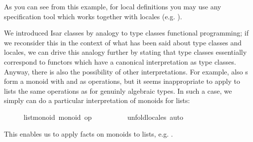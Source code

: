 \begin{isabellebody}
\begin{isamarkuptext}
  \noindent As you can see from this example, for local
  definitions you may use any specification tool
  which works together with locales (e.g. \cite{krauss2006}).%
\end{isamarkuptext}%
\isamarkuptrue%
%
\isamarkuptrue%
%
\begin{isamarkuptext}%
We introduced Isar classes by analogy to type classes
  functional programming;  if we reconsider this in the
  context of what has been said about type classes and locales,
  we can drive this analogy further by stating that type
  classes essentially correspond to functors which have
  a canonical interpretation as type classes.
  Anyway, there is also the possibility of other interpretations.
  For example, also s form a monoid with
   and \isa{{\isacharbrackleft}{\isacharbrackright}} as operations, but it
  seems inappropriate to apply to lists
  the same operations as for genuinly algebraic types.
  In such a case, we simply can do a particular interpretation
  of monoids for lists:%
\end{isamarkuptext}%
\isamarkuptrue%
\ \ \ \ \isamarkupfalse%
\ list{\isacharunderscore}monoid{\isacharcolon}\ monoid\ {\isacharbrackleft}{\isachardoublequoteopen}op\ {\isacharat}{\isachardoublequoteclose}\ {\isachardoublequoteopen}{\isacharbrackleft}{\isacharbrackright}{\isachardoublequoteclose}{\isacharbrackright}\isanewline
%
\isadelimproof
\ \ \ \ \ \ %
\endisadelimproof
%
\isatagproof
{}\isamarkupfalse%
\ unfold{\isacharunderscore}locales\ auto%
\endisatagproof
{\isafoldproof}%
%
\isadelimproof
%
\endisadelimproof
%
\begin{isamarkuptext}%
\noindent This enables us to apply facts on monoids
  to lists, e.g. .


\end{isamarkuptext}
\end{isabellebody}
